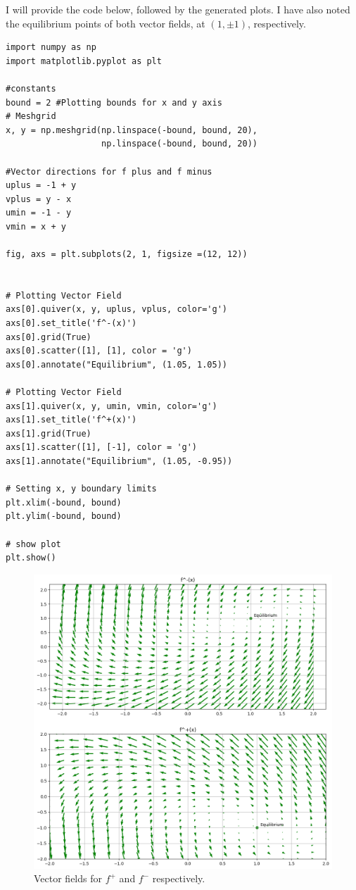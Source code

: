 \partbreak
\begin{solution}
    I will provide the code below, followed by the generated plots. I have also noted the equilibrium points of both vector fields, at $(1, \pm1)$, respectively. 
    \jump
    
\begin{lstlisting}
import numpy as np 
import matplotlib.pyplot as plt 

#constants
bound = 2 #Plotting bounds for x and y axis
# Meshgrid 
x, y = np.meshgrid(np.linspace(-bound, bound, 20),  
                   np.linspace(-bound, bound, 20)) 

#Vector directions for f plus and f minus
uplus = -1 + y
vplus = y - x
umin = -1 - y
vmin = x + y

fig, axs = plt.subplots(2, 1, figsize =(12, 12))


# Plotting Vector Field  
axs[0].quiver(x, y, uplus, vplus, color='g') 
axs[0].set_title('f^-(x)') 
axs[0].grid(True)
axs[0].scatter([1], [1], color = 'g')
axs[0].annotate("Equilibrium", (1.05, 1.05))

# Plotting Vector Field  
axs[1].quiver(x, y, umin, vmin, color='g') 
axs[1].set_title('f^+(x)') 
axs[1].grid(True)
axs[1].scatter([1], [-1], color = 'g')
axs[1].annotate("Equilibrium", (1.05, -0.95))

# Setting x, y boundary limits 
plt.xlim(-bound, bound) 
plt.ylim(-bound, bound) 
  
# show plot
plt.show() 
\end{lstlisting}

\jump
\begin{figure}[!ht]
\centering
\includegraphics[scale = 0.6]{Images/individual vector fields.png}
\caption{Vector fields for $f^+$ and $f^-$ respectively.}
\label{png:individual vector fields}
\end{figure}
\end{solution}

